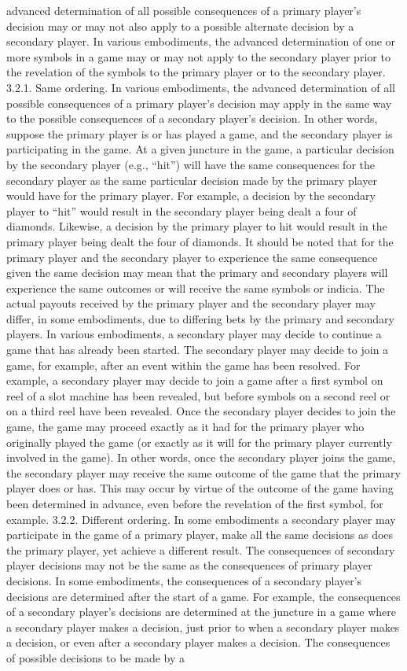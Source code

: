\documentclass[11pt,a4paper]{article}
\begin{document}
advanced determination of all possible consequences of a primary player's decision may or may not also apply to a possible alternate decision by a secondary player. In various embodiments, the advanced determination of one or more symbols in a game may or may not apply to the secondary player prior to the revelation of the symbols to the primary player or to the secondary player. 3.2.1. Same ordering. In various embodiments, the advanced determination of all possible consequences of a primary player's decision may apply in the same way to the possible consequences of a secondary player's decision. In other words, suppose the primary player is or has played a game, and the secondary player is participating in the game. At a given juncture in the game, a particular decision by the secondary player (e.g., “hit”) will have the same consequences for the secondary player as the same particular decision made by the primary player would have for the primary player. For example, a decision by the secondary player to “hit” would result in the secondary player being dealt a four of diamonds. Likewise, a decision by the primary player to hit would result in the primary player being dealt the four of diamonds. It should be noted that for the primary player and the secondary player to experience the same consequence given the same decision may mean that the primary and secondary players will experience the same outcomes or will receive the same symbols or indicia. The actual payouts received by the primary player and the secondary player may differ, in some embodiments, due to differing bets by the primary and secondary players. In various embodiments, a secondary player may decide to continue a game that has already been started. The secondary player may decide to join a game, for example, after an event within the game has been resolved. For example, a secondary player may decide to join a game after a first symbol on reel of a slot machine has been revealed, but before symbols on a second reel or on a third reel have been revealed. Once the secondary player decides to join the game, the game may proceed exactly as it had for the primary player who originally played the game (or exactly as it will for the primary player currently involved in the game). In other words, once the secondary player joins the game, the secondary player may receive the same outcome of the game that the primary player does or has. This may occur by virtue of the outcome of the game having been determined in advance, even before the revelation of the first symbol, for example. 3.2.2. Different ordering. In some embodiments a secondary player may participate in the game of a primary player, make all the same decisions as does the primary player, yet achieve a different result. The consequences of secondary player decisions may not be the same as the consequences of primary player decisions. In some embodiments, the consequences of a secondary player's decisions are determined after the start of a game. For example, the consequences of a secondary player's decisions are determined at the juncture in a game where a secondary player makes a decision, just prior to when a secondary player makes a decision, or even after a secondary player makes a decision. The consequences of possible decisions to be made by a 
\end{document}
